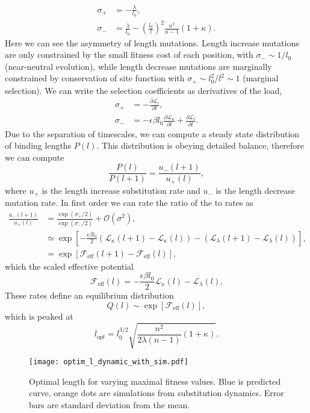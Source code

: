 \begin{align}
	\sigma_+ &= -\frac{\lambda}{l_0},\\
	\sigma_- &= \frac{\lambda}{l_0} - \left(\frac{l_0}{l}\right)^2\frac{n^2}{n-1}(1+\kappa).
\end{align}
Here we can see the asymmetry of length mutations. Length increase mutations are only constrained by the small fitness cost of each position, with $\sigma_-\sim 1/l_0$ (near-neutral evolution), while length decrease mutations  are marginally constrained by conservation of site function with $\sigma_+ \sim l_0^2/l^2\sim 1$ (marginal selection). We can write the selection coefficients as derivatives of the load,
\begin{align}
	\sigma_+ &= -\frac{\partial \mathcal{L}_l}{\partial l},\\
	\sigma_- &= -\epsilon\beta l_0\frac{\partial \mathcal{L}_\kappa}{\partial l} +\frac{\partial \mathcal{L}_l}{\partial l}.
\end{align}
Due to the separation of timescales, we can compute a steady state distribution of binding lengths $P(l)$. This distribution is obeying detailed balance, therefore we can compute
\begin{equation}
	\frac{P(l)}{P(l+1)}= \frac{u_-(l+1)}{u_+(l)},
\end{equation}
where $u_+$ is the length increase substitution rate and $u_-$ is the length decrease mutation rate. In first order we can rate the ratio of the to rates as 
\begin{align}
	\frac{u_-(l+1)}{u_+(l)} &= \frac{\exp(\sigma_+/2)}{\exp(\sigma_-/2)} + \mathcal{O}(\sigma^2),\\
	&\simeq\exp\left[ -\frac{\epsilon\beta l_0}{2}\left( \mathcal{L}_\kappa(l+1) - \mathcal{L}_\kappa(l) \right) - \left( \mathcal{L}_\lambda(l+1) - \mathcal{L}_\lambda(l) \right)\right],\\
	&=\exp\left[ \mathcal{F}_\mathrm{eff}(l+1) - \mathcal{F}_\mathrm{eff}(l) \right],
\end{align}
which the scaled effective potential
\begin{equation}
	\mathcal{F}_\mathrm{eff}(l) = -\frac{\epsilon\beta l_0}{2}\mathcal{L}_\kappa(l) - \mathcal{L}_\lambda (l).
\end{equation}
These rates define an equilibrium distribution 
\begin{equation}
	Q(l) \sim \exp\left[ \mathcal{F}_\mathrm{eff}(l) \right],
\end{equation}
which is peaked at 
\begin{equation}
	l_{opt} = l_0^{3/2}\sqrt{\frac{n^2}{ 2\lambda (n-1)}(1+\kappa)}.
\end{equation}

\begin{figure}
	\centering
	\texttt{[image: optim\_l\_dynamic\_with\_sim.pdf]}
	\caption{Optimal length for varying maximal fitness values. Blue is predicted curve, orange dots are simulations from substitution dynamics. Error bars are standard deviation from the mean.}
	\label{}
\end{figure}

